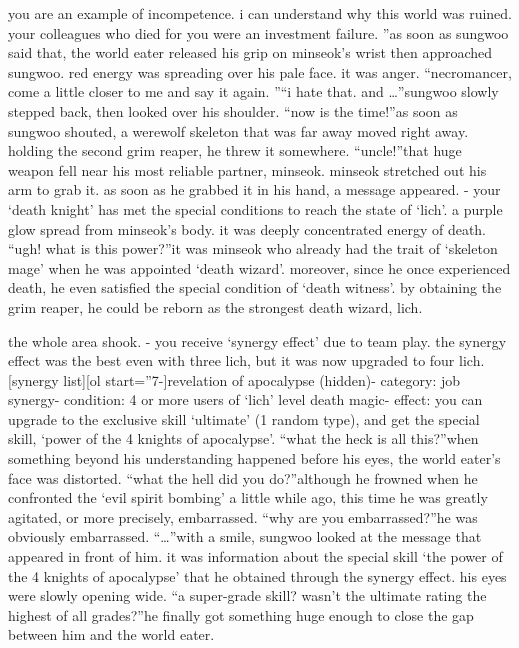  you are an example of incompetence.
 i can understand why this world was ruined.
 your colleagues who died for you were an investment failure.
”as soon as sungwoo said that, the world eater released his grip on minseok’s wrist then approached sungwoo.
 red energy was spreading over his pale face.
 it was anger.
“necromancer, come a little closer to me and say it again.
”“i hate that.
 and …”sungwoo slowly stepped back, then looked over his shoulder.
“now is the time!”as soon as sungwoo shouted, a werewolf skeleton that was far away moved right away.
holding the second grim reaper, he threw it somewhere.
“uncle!”that huge weapon fell near his most reliable partner, minseok.
 minseok stretched out his arm to grab it.
 as soon as he grabbed it in his hand, a message appeared.
- your ‘death knight’ has met the special conditions to reach the state of ‘lich’.
a purple glow spread from minseok’s body.
 it was deeply concentrated energy of death.
“ugh! what is this power?”it was minseok who already had the trait of ‘skeleton mage’ when he was appointed ‘death wizard’.
 moreover, since he once experienced death, he even satisfied the special condition of ‘death witness’.
by obtaining the grim reaper, he could be reborn as the strongest death wizard, lich.


the whole area shook.
- you receive ‘synergy effect’ due to team play.
the synergy effect was the best even with three lich, but it was now upgraded to four lich.
[synergy list][ol start=”7-]revelation of apocalypse (hidden)- category: job synergy- condition: 4 or more users of ‘lich’ level death magic- effect: you can upgrade to the exclusive skill ‘ultimate’ (1 random type), and get the special skill, ‘power of the 4 knights of apocalypse’.
“what the heck is all this?”when something beyond his understanding happened before his eyes, the world eater’s face was distorted.
“what the hell did you do?”although he frowned when he confronted the ‘evil spirit bombing’ a little while ago, this time he was greatly agitated, or more precisely, embarrassed.
“why are you embarrassed?”he was obviously embarrassed.
“…”with a smile, sungwoo looked at the message that appeared in front of him.
 it was information about the special skill ‘the power of the 4 knights of apocalypse’ that he obtained through the synergy effect.
his eyes were slowly opening wide.
“a super-grade skill? wasn’t the ultimate rating the highest of all grades?”he finally got something huge enough to close the gap between him and the world eater.


 